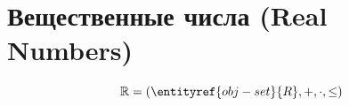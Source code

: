 
\section{Вещественные числа (Real Numbers)}

\hypertarget{obj-real-numbers}{}
\hypertarget{obj-real-numbers}{}
\begin{object}
\label{entity:obj-real-numbers}


\[ \mathbb{R} = (\entityref{obj-set}{R}, +, \cdot, \leq) \]
\end{object}